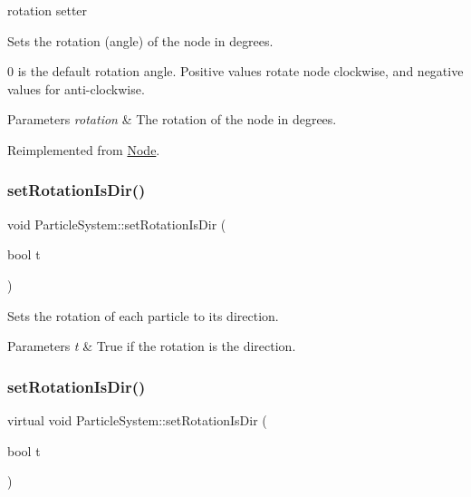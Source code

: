 rotation setter 

Sets the rotation (angle) of the node in degrees.

0 is the default rotation angle. Positive values rotate node clockwise, and negative values for anti-\/clockwise.


\begin{DoxyParams}{Parameters}
{\em rotation} & The rotation of the node in degrees. \\
\hline
\end{DoxyParams}


Reimplemented from \hyperlink{classNode_a62dda439f77712f0d9b405ce887df676}{Node}.

\mbox{\label{classParticleSystem_a696b9310f5d29df6d75d954baed79b93}} 
\subsubsection{\texorpdfstring{set\+Rotation\+Is\+Dir()}{setRotationIsDir()}\hspace{0.1cm}{\footnotesize\ttfamily [1/2]}}
{\footnotesize\ttfamily void Particle\+System\+::set\+Rotation\+Is\+Dir (\begin{DoxyParamCaption}\item[{bool}]{t }\end{DoxyParamCaption})\hspace{0.3cm}{\ttfamily [virtual]}}

Sets the rotation of each particle to its direction.


\begin{DoxyParams}{Parameters}
{\em t} & True if the rotation is the direction. \\
\hline
\end{DoxyParams}
\mbox{\label{classParticleSystem_a612d4c50fa3fe077aae1563221c3f5ac}} 
\subsubsection{\texorpdfstring{set\+Rotation\+Is\+Dir()}{setRotationIsDir()}\hspace{0.1cm}{\footnotesize\ttfamily [2/2]}}
{\footnotesize\ttfamily virtual void Particle\+System\+::set\+Rotation\+Is\+Dir (\begin{DoxyParamCaption}\item[{bool}]{t }\end{DoxyParamCaption})\hspace{0.3cm}{\ttfamily [virtual]}}

